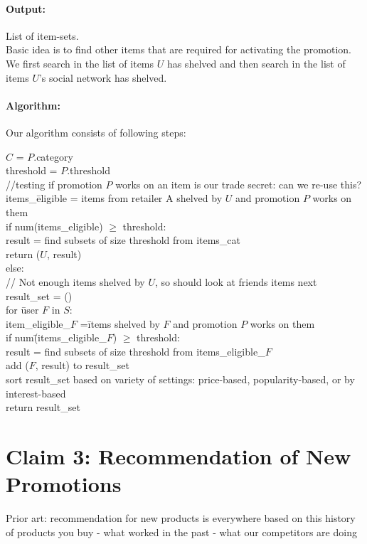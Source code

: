 \documentclass[11pt]{article}
\begin{document}
\paragraph{Output:} List of item-sets.\\


Basic idea is to find other items that are required for activating the promotion. We first search in the list of items $U$ has shelved and then search
in the list of items $U$'s social network has shelved.

\paragraph{Algorithm:} Our algorithm consists of following steps:\\
\begin{tabbing}	
$C$ = $P$.category\\
threshold = $P$.threshold\\
//testing if promotion $P$ works on an item is our trade secret: can we re-use this?\\
items\_\=eligible = items from retailer A shelved by $U$ and promotion $P$ works on them\\
if num(items\_eligible) $\ge$ threshold:\\
\>result = find subsets of size threshold from items\_cat\\
\>return ($U$, result)\\
else:\\
\>// Not enough items shelved by $U$, so should look at friends items next\\
\>result\_set = ()\\
\>for \=user $F$ in $S$:\\
\>\> item\_eligible\_$F$ =\=  items shelved by $F$ and promotion $P$ works on them\\
\>\> if num\=(items\_eligible\_$F$) $\ge$ threshold:\\
\>\>\>result = find subsets of size threshold from items\_eligible\_$F$\\
\>\>\>add ($F$, result) to result\_set\\
\>sort result\_set based on variety of settings: price-based, popularity-based, or by interest-based\\ 
\>return result\_set\\


\end{tabbing}

\section{Claim 3: Recommendation of New Promotions}
Prior art: recommendation for new products is everywhere based on this history of products you buy
- what worked in the past
- what our competitors are doing
\end{document}
